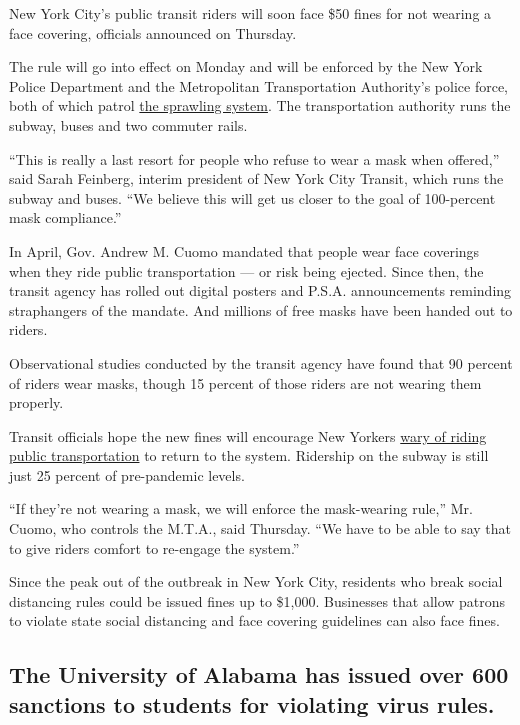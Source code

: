 New York City's public transit riders will soon face \$50 fines for not
wearing a face covering, officials announced on Thursday.

The rule will go into effect on Monday and will be enforced by the New
York Police Department and the Metropolitan Transportation Authority's
police force, both of which patrol
\href{https://www.nytimes3xbfgragh.onion/2020/08/26/nyregion/nyc-subway-bus-service-cuts.html}{the
sprawling system}. The transportation authority runs the subway, buses
and two commuter rails.

``This is really a last resort for people who refuse to wear a mask when
offered,'' said Sarah Feinberg, interim president of New York City
Transit, which runs the subway and buses. ``We believe this will get us
closer to the goal of 100-percent mask compliance.''

In April, Gov. Andrew M. Cuomo mandated that people wear face coverings
when they ride public transportation --- or risk being ejected. Since
then, the transit agency has rolled out digital posters and P.S.A.
announcements reminding straphangers of the mandate. And millions of
free masks have been handed out to riders.

Observational studies conducted by the transit agency have found that 90
percent of riders wear masks, though 15 percent of those riders are not
wearing them properly.

Transit officials hope the new fines will encourage New Yorkers
\href{https://www.nytimes3xbfgragh.onion/interactive/2020/08/10/nyregion/nyc-subway-coronavirus.html}{wary
of riding public transportation} to return to the system. Ridership on
the subway is still just 25 percent of pre-pandemic levels.

``If they're not wearing a mask, we will enforce the mask-wearing
rule,'' Mr. Cuomo, who controls the M.T.A., said Thursday. ``We have to
be able to say that to give riders comfort to re-engage the system.''

Since the peak out of the outbreak in New York City, residents who break
social distancing rules could be issued fines up to \$1,000. Businesses
that allow patrons to violate state social distancing and face covering
guidelines can also face fines.

\hypertarget{the-university-of-alabama-has-issued-over-600-sanctions-to-students-for-violating-virus-rules}{%
\subsection{The University of Alabama has issued over 600 sanctions to
students for violating virus
rules.}\label{the-university-of-alabama-has-issued-over-600-sanctions-to-students-for-violating-virus-rules}}

